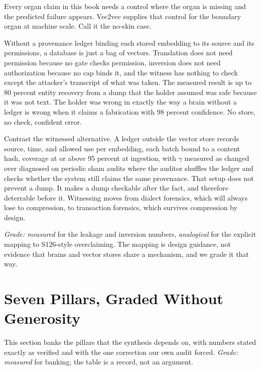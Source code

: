 Every organ claim in this book needs a control where the organ is missing and the predicted failure appears. Vec2vec supplies that control for the boundary organ at machine scale. Call it the no-skin case.

Without a provenance ledger binding each stored embedding to its source and its permissions, a database is just a bag of vectors. Translation does not need permission because no gate checks permission, inversion does not need authorization because no cap binds it, and the witness has nothing to check except the attacker's transcript of what was taken. The measured result is up to 80 percent entity recovery from a dump that the holder assumed was safe because it was not text. The holder was wrong in exactly the way a brain without a ledger is wrong when it claims a fabrication with 98 percent confidence. No store, no check, confident error.

Contrast the witnessed alternative. A ledger outside the vector store records source, time, and allowed use per embedding, each batch bound to a content hash, coverage at or above 95 percent at ingestion, with $\gamma$ measured as changed over diagnosed on periodic sham audits where the auditor shuffles the ledger and checks whether the system still claims the same provenance. That setup does not prevent a dump. It makes a dump checkable after the fact, and therefore deterrable before it. Witnessing moves from dialect forensics, which will always lose to compression, to transaction forensics, which survives compression by design.

\textit{Grade: measured} for the leakage and inversion numbers, \textit{analogical} for the explicit mapping to S126-style overclaiming. The mapping is design guidance, not evidence that brains and vector stores share a mechanism, and we grade it that way.

\section{Seven Pillars, Graded Without Generosity}
\label{sec:ch09-pillars}

This section banks the pillars that the synthesis depends on, with numbers stated exactly as verified and with the one correction our own audit forced. \textit{Grade: measured} for banking; the table is a record, not an argument.

